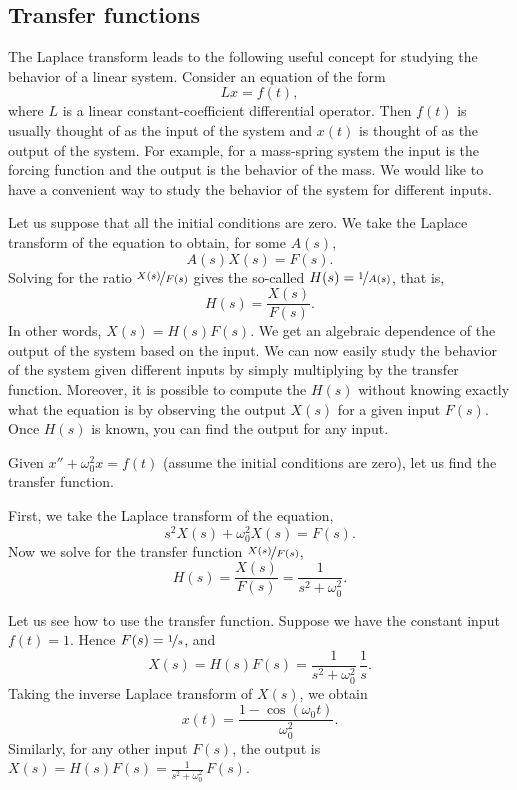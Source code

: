 \subsection{Transfer functions}

The Laplace transform leads to the following useful concept for studying the
behavior of a linear system.  Consider an equation of the
form
\begin{equation*}
L x = f(t) ,
\end{equation*}
where $L$ is a linear constant-coefficient differential operator.
Then $f(t)$ is usually thought of as the input of the system and $x(t)$ is
thought of as the output of the system.  For example, for a mass-spring
system the input is the forcing function and the output is the behavior of the
mass.  We would like to have a convenient way to study the behavior of
the system for different inputs.

Let us suppose that
all the initial conditions are zero.
We take the Laplace transform of the equation to obtain, for some $A(s)$,
\begin{equation*}
A(s) X(s) = F(s) .
\end{equation*}
Solving for the ratio $\nicefrac{X(s)}{F(s)}$ gives the so-called
\emph{}
$H(s) = \nicefrac{1}{A(s)}$,
that is,
\begin{equation*}
H(s) = \frac{X(s)}{F(s)} .
\end{equation*}
In other words, $X(s) = H(s) F(s)$.  We get an algebraic dependence of
the output of the system based on the input.  We can now easily study the
behavior of the system given different inputs by simply
multiplying by the transfer function.
Moreover, it is possible to compute the $H(s)$ without knowing exactly what
the equation is by observing the output $X(s)$ for a given input $F(s)$.
Once $H(s)$ is known, you can find the output for any input.

\begin{example}
Given $x'' + \omega_0^2 x = f(t)$ (assume the initial conditions are zero),
let us find the transfer function.

First, we take the Laplace transform of the equation,
\begin{equation*}
s^2 X(s) + \omega_0^2 X(s) = F(s) .
\end{equation*}
Now we solve for the transfer function $\nicefrac{X(s)}{F(s)}$,
\begin{equation*}
H(s) = \frac{X(s)}{F(s)} = \frac{1}{s^2 + \omega_0^2} .
\end{equation*}

Let us see how to use the transfer function.  Suppose we have the constant input
$f(t) = 1$.  Hence $F(s) = \nicefrac{1}{s}$, and
\begin{equation*}
X(s) = H(s) F(s) = \frac{1}{s^2+\omega_0^2} \, \frac{1}{s} .
\end{equation*}
Taking the inverse Laplace transform of $X(s)$, we obtain
\begin{equation*}
x(t) = \frac{1-\cos(\omega_0 t)}{\omega_0^2} .
\end{equation*}
Similarly, for any other input $F(s)$, the output is
$X(s) = H(s) F(s) = \frac{1}{s^2+\omega_0^2} \, F(s)$.
\end{example}

